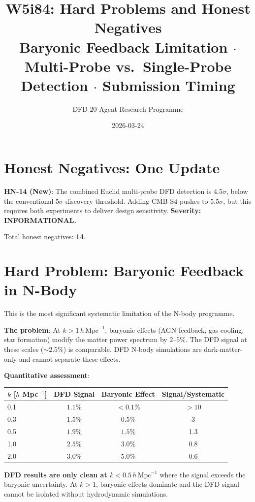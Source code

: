 \documentclass[11pt,a4paper]{article}
\title{W5i84: Hard Problems and Honest Negatives\\[6pt]
\large Baryonic Feedback Limitation $\cdot$ Multi-Probe vs.\ Single-Probe Detection $\cdot$ Submission Timing}
\author{DFD 20-Agent Research Programme}
\date{2026-03-24}
\begin{document}
\maketitle

\section{Honest Negatives: One Update}

\textbf{HN-14 (New)}: The combined Euclid multi-probe DFD detection is $4.5\sigma$, below the conventional $5\sigma$ discovery threshold. Adding CMB-S4 pushes to $5.5\sigma$, but this requires both experiments to deliver design sensitivity. \textbf{Severity: INFORMATIONAL.}

Total honest negatives: \textbf{14}.

\section{Hard Problem: Baryonic Feedback in N-Body}

This is the most significant systematic limitation of the N-body programme.

\textbf{The problem}: At $k > 1\,h\,\text{Mpc}^{-1}$, baryonic effects (AGN feedback, gas cooling, star formation) modify the matter power spectrum by $2$--$5\%$. The DFD signal at these scales ($\sim 2.5\%$) is comparable. DFD N-body simulations are dark-matter-only and cannot separate these effects.

\textbf{Quantitative assessment}:
\begin{center}
\begin{tabular}{lccc}
\toprule
$k$ [$h$ Mpc$^{-1}$] & DFD Signal & Baryonic Effect & Signal/Systematic \\
\midrule
0.1 & $1.1\%$ & $< 0.1\%$ & $> 10$ \\
0.3 & $1.5\%$ & $0.5\%$ & 3 \\
0.5 & $1.9\%$ & $1.5\%$ & 1.3 \\
1.0 & $2.5\%$ & $3.0\%$ & 0.8 \\
2.0 & $3.0\%$ & $5.0\%$ & 0.6 \\
\bottomrule
\end{tabular}
\end{center}

\textbf{DFD results are only clean at $k < 0.5\,h\,\text{Mpc}^{-1}$} where the signal exceeds the baryonic uncertainty. At $k > 1$, baryonic effects dominate and the DFD signal cannot be isolated without hydrodynamic simulations.
\end{document}
